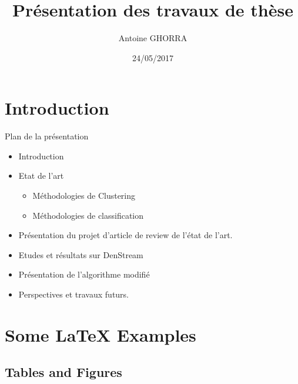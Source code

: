 \documentclass{beamer}
\title[Your Short Title]{Présentation des travaux de thèse}
\author{Antoine GHORRA}
\institute{Département informatique et automatique- Institut Mines Telecom}
\date{24/05/2017}
\begin{document}
\begin{frame}
  \titlepage
\end{frame}


\section{Introduction}

\begin{frame}{Plan de la présentation}

\begin{itemize}
  \item Introduction
  \item Etat de l'art
  \begin{itemize}
  	\item Méthodologies de Clustering
  	\item Méthodologies de classification
  \end{itemize} 
  \item Présentation du projet d'article de review de l'état de l'art.
  \item Etudes et résultats sur DenStream
  \item Présentation de l'algorithme modifié
  \item Perspectives et travaux futurs.
\end{itemize}

\vskip 1cm


\end{frame}

\section{Some \LaTeX{} Examples}

\subsection{Tables and Figures}
\end{document}
